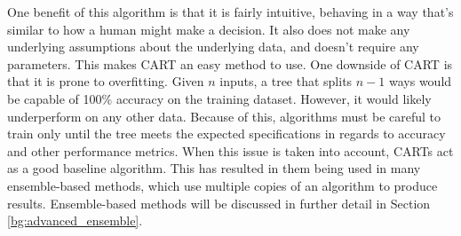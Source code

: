 \documentclass[11pt]{report}
\begin{document}
	\par One benefit of this algorithm is that it is fairly intuitive, behaving in a way that's similar to how a human might make a decision. It also does not make any underlying assumptions about the underlying data, and doesn't require any parameters. This makes CART an easy method to use. One downside of CART is that it is prone to overfitting. Given $n$ inputs, a tree that splits $n-1$ ways would be capable of 100\% accuracy on the training dataset. However, it would likely underperform on any other data. Because of this, algorithms must be careful to train only until the tree meets the expected specifications in regards to accuracy and other performance metrics. When this issue is taken into account, CARTs act as a good baseline algorithm. This has resulted in them being used in many ensemble-based methods, which use multiple copies of an algorithm to produce results. Ensemble-based methods will be discussed in further detail in Section \ref{bg:advanced_ensemble}.
	
\end{document}
